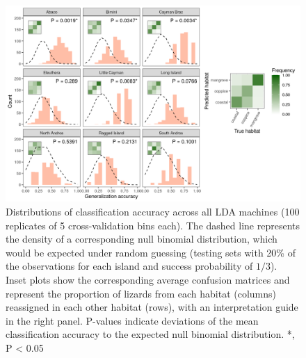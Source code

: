\begin{figure}[H]
    \centering
	\includegraphics[width=\textwidth]{../analyses/04-machine learning/plots/classif_lda_pca.png}
	\caption{Distributions of classification accuracy across all LDA machines (100 replicates of 5 cross-validation bins each). The dashed line represents the density of a corresponding null binomial distribution, which would be expected under random guessing (testing sets with 20\% of the observations for each island and success probability of $1/3$). Inset plots show the corresponding average confusion matrices and represent the proportion of lizards from each habitat (columns) reassigned in each other habitat (rows), with an interpretation guide in the right panel. P-values indicate deviations of the mean classification accuracy to the expected null binomial distribution. *, P < 0.05}
	\label{supfig:classif_lda_pca}
\end{figure}

